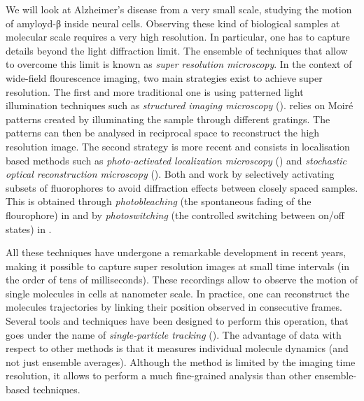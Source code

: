 We will look at Alzheimer's disease from a very small scale, studying the motion of amyloyd-β inside neural cells. Observing these kind of biological samples at molecular scale requires a very high resolution. In particular, one has to capture details beyond the light diffraction limit. The ensemble of techniques that allow to overcome this limit is known as \emph{super resolution microscopy}. In the context of wide-field flourescence imaging, two main strategies exist to achieve super resolution. The first and more traditional one is using patterned light illumination techniques such as \emph{structured imaging microscopy} ().  relies on Moiré patterns created by illuminating the sample through different gratings. The patterns can then be analysed in reciprocal space to reconstruct the high resolution image. The second strategy is more recent and consists in localisation based methods such as \emph{photo-activated localization microscopy} () and \emph{stochastic optical reconstruction microscopy} (). Both  and  work by selectively activating subsets of fluorophores to avoid diffraction effects between closely spaced samples. This is obtained through \emph{photobleaching} (the spontaneous fading of the flourophore) in  and by \emph{photoswitching} (the controlled switching between on/off states) in .

All these techniques have undergone a remarkable development in recent years, making it possible to capture super resolution images at small time intervals (in the order of tens of milliseconds). These recordings allow to observe the motion of single molecules in cells at nanometer scale. In practice, one can reconstruct the molecules trajectories by linking their position observed in consecutive frames. Several tools and techniques have been designed to perform this operation, that goes under the name of \emph{single-particle tracking} (). The advantage of  data with respect to other methods is that it measures individual molecule dynamics (and not just ensemble averages). Although the method is limited by the imaging time resolution, it allows to perform a much fine-grained analysis than other ensemble-based techniques.
